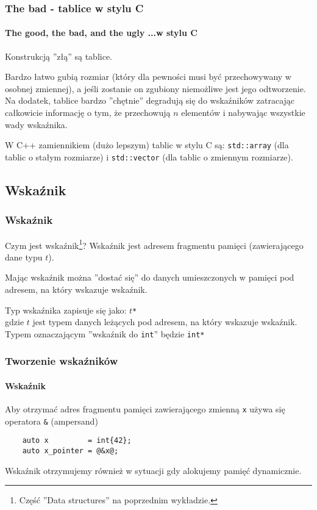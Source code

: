 \documentclass[aspectratio=169]{beamer}
\begin{document}
\begin{frame}
    \frametitle{The bad - tablice w stylu C}
    \framesubtitle{The good, the bad, and the ugly ...w stylu C}

    Konstrukcją ''złą'' są tablice.

    \vspace{1em}

    Bardzo łatwo gubią rozmiar (który dla pewności musi być przechowywany w
    osobnej zmiennej), a jeśli zostanie on zgubiony niemożliwe jest jego
    odtworzenie. Na dodatek, tablice bardzo ''chętnie'' degradują się do
    wskaźników zatracając całkowicie informację o tym, że przechowują $n$
    elementów i nabywając wszystkie wady wskaźnika.

    \vspace{1em}

    W C++ zamiennikiem (dużo lepszym) tablic w stylu C są: {\tt std::array} (dla
    tablic o stałym rozmiarze) i {\tt std::vector} (dla tablic o zmiennym
    rozmiarze).
\end{frame}

\subsection{Wskaźnik}

\begin{frame}
    \frametitle{Wskaźnik}

    Czym jest wskaźnik\footnote{Część ''Data structures'' na poprzednim
    wykładzie.}? Wskaźnik jest adresem fragmentu pamięci (zawierającego dane
    typu $t$).
    \label{what_is_a_pointer}

    \vspace{1em}

    Mając wskaźnik można ''dostać się'' do danych umieszczonych w pamięci pod
    adresem, na który wskazuje wskaźnik.

    \vspace{1em}

    Typ wskaźnika zapisuje się jako: {\tt $t$*}\\gdzie $t$ jest typem danych
    leżących pod adresem, na który wskazuje wskaźnik.\\
    Typem oznaczającym ''wskaźnik do {\tt int}'' będzie {\tt int*}
\end{frame}

\begin{frame}[fragile]
    \frametitle{Tworzenie wskaźników}
    \framesubtitle{Wskaźnik}

    Aby otrzymać adres fragmentu pamięci zawierającego zmienną {\tt x} używa się
    operatora {\tt \&} (ampersand)

    \begin{lstlisting}
    auto x         = int{42};
    auto x_pointer = @&x@;
    \end{lstlisting}
    \vspace{2.5em}

    Wskaźnik otrzymujemy również w sytuacji gdy alokujemy pamięć dynamicznie.
\end{frame}
\end{document}
